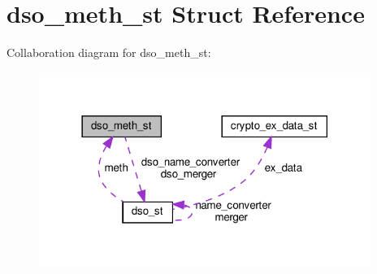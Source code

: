 \hypertarget{structdso__meth__st}{}\section{dso\+\_\+meth\+\_\+st Struct Reference}
\label{structdso__meth__st}


Collaboration diagram for dso\+\_\+meth\+\_\+st\+:
\nopagebreak
\begin{figure}[H]
\begin{center}
\leavevmode
\includegraphics[width=306pt]{structdso__meth__st__coll__graph}
\end{center}
\end{figure}
